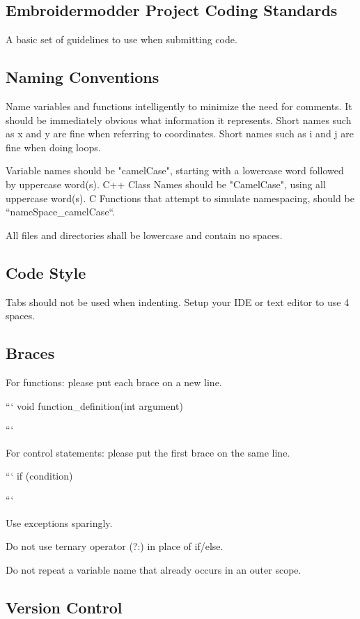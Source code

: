 \documentclass[11pt]{report}
\begin{document}
\subsection{Embroidermodder Project Coding Standards}

A basic set of guidelines to use when submitting code.

\subsection{Naming Conventions}

Name variables and functions intelligently to minimize the need for
comments. It should be immediately obvious what information it
represents. Short names such as x and y are fine when referring to
coordinates. Short names such as i and j are fine when doing loops.

Variable names should be "camelCase", starting with a lowercase word
followed by uppercase word(s). C++ Class Names should be "CamelCase",
using all uppercase word(s). C Functions that attempt to simulate namespacing,
should be ``nameSpace\_camelCase``.

All files and directories shall be lowercase and contain no spaces.

\subsection{Code Style}

Tabs should not be used when indenting. Setup your IDE or text editor to
use 4 spaces.

\subsection{Braces}

For functions: please put each brace on a new line.

```
void function\_definition(int argument)
{

}
```

For control statements: please put the first brace on the same line.

```
if (condition) {

}
```

Use exceptions sparingly.

Do not use ternary operator (?:) in place of if/else.

Do not repeat a variable name that already occurs in an outer scope.

\subsection{Version Control}
\end{document}
